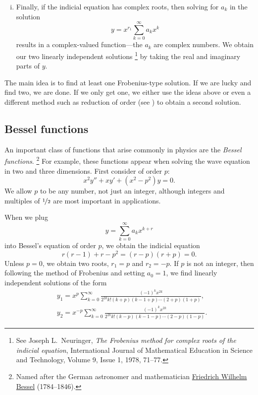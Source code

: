 \begin{enumerate}[(i)]
constants $b_k$ and $C$.
\item
Finally, if the indicial equation has complex roots, then solving
for $a_k$ in the solution
\begin{equation*}
y = x^{r_1} \sum_{k=0}^\infty a_k x^{k}
\end{equation*}
results in a complex-valued function---the $a_k$ are complex
numbers.  We obtain our two linearly independent
solutions%
\footnote{See 
Joseph L.\ Neuringer,
\emph{The Frobenius method for complex roots of the indicial equation},
International Journal of Mathematical Education in Science and Technology,
Volume 9, Issue 1, 1978, 71--77.}
by taking the real and imaginary parts of $y$.
\end{enumerate}

The main idea is to find at least one Frobenius-type solution.  If
we are lucky and find two, we are done.
If we only get one, we either use the ideas above or even a different method
such as reduction of order (see ) to
obtain a second solution.

\subsection{Bessel functions} \label{bessel:subsection}

An important class of functions that arise commonly in physics are the
\emph{Bessel functions}.%
\footnote{Named after
the German astronomer and mathematician
\href{http://en.wikipedia.org/wiki/Friedrich_Bessel}{Friedrich Wilhelm
Bessel} (1784--1846).}
For example, these functions appear when solving the
wave equation in two and three dimensions.  First consider
\emph{} of order $p$:
\begin{equation*}
x^2 y'' + xy' + \left(x^2 - p^2\right)y = 0 .
\end{equation*}
We allow $p$ to be any number, not just an integer, although integers
and multiples of $\nicefrac{1}{2}$ are most important in applications.

When we plug
\begin{equation*}
y = \sum_{k=0}^\infty a_k x^{k+r}
\end{equation*}
into Bessel's equation of order $p$, we obtain the indicial equation
\begin{equation*}
r(r-1)+r-p^2 = (r-p)(r+p) = 0 .
\end{equation*}
Unless $p=0$, we obtain two roots, $r_1 = p$ and $r_2 = -p$.
If $p$ is not an integer, then following the method of Frobenius and
setting $a_0 = 1$, we find
linearly independent solutions of the form
\begin{align*}
& y_1 = x^p \sum_{k=0}^\infty
\frac{{(-1)}^k x^{2k}}{2^{2k} k! (k+p)(k-1+p)\cdots (2+p)(1+p)} ,
\\
& y_2 = x^{-p} \sum_{k=0}^\infty
\frac{{(-1)}^k x^{2k}}{2^{2k} k! (k-p)(k-1-p)\cdots (2-p)(1-p)} .
\end{align*}


